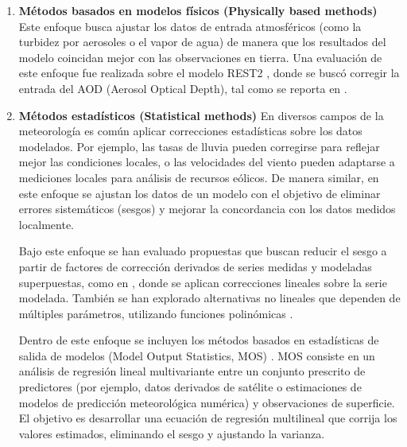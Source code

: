 \documentclass[letterpaper,12pt, twoside]{report}
\providecommand{\DIFdeltex}[1]{{\protect\color{red} \scriptsize #1}} %
\providecommand{\DIFdel}[1]{\texorpdfstring{\DIFdeltex{#1}}{}} %
\begin{document}
\begin{enumerate}%
\item%
\DIFdel{\textbf{Métodos basados en modelos físicos (Physically based methods)}}%
\DIFdel{Este enfoque busca ajustar los datos de entrada atmosféricos (como la turbidez por aerosoles o el vapor de agua) de manera que los resultados del modelo coincidan mejor con las observaciones en tierra. Una evaluación de este enfoque fue realizada sobre el modelo REST2 \citep{Gueymard2008}, donde se buscó corregir la entrada del AOD (Aerosol Optical Depth), tal como se reporta en \citep{Gueymard2012}.
    }%

\item%
\DIFdel{\textbf{Métodos estadísticos (Statistical methods)}}%
\DIFdel{En diversos campos de la meteorología es común aplicar correcciones estadísticas sobre los datos modelados. Por ejemplo, las tasas de lluvia pueden corregirse para reflejar mejor las condiciones locales, o las velocidades del viento pueden adaptarse a mediciones locales para análisis de recursos eólicos. De manera similar, en este enfoque se ajustan los datos de un modelo con el objetivo de eliminar errores sistemáticos (sesgos) y mejorar la concordancia con los datos medidos localmente.}%

\DIFdel{Bajo este enfoque se han evaluado propuestas que buscan reducir el sesgo a partir de factores de corrección derivados de series medidas y modeladas superpuestas, como en \citep{Polo2015, Harmsen2014}, donde se aplican correcciones lineales sobre la serie modelada. También se han explorado alternativas no lineales que dependen de múltiples parámetros, utilizando funciones polinómicas \citep{Carow2008}.}%

\DIFdel{Dentro de este enfoque se incluyen los métodos basados en estadísticas de salida de modelos (Model Output Statistics, MOS) \citep{Bender2011}. MOS consiste en un análisis de regresión lineal multivariante entre un conjunto prescrito de predictores (por ejemplo, datos derivados de satélite o estimaciones de modelos de predicción meteorológica numérica) y observaciones de superficie. El objetivo es desarrollar una ecuación de regresión multilineal que corrija los valores estimados, eliminando el sesgo y ajustando la varianza.}%


\end{enumerate}
\end{document}
